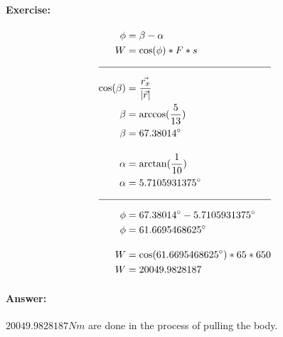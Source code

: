 \documentclass{article}
\begin{document}
\paragraph{Exercise:}

\begin{align} 
    \phi &= \beta - \alpha \\
    W &= \cos(\phi)*F*s \\[10pt]
    \hline 
    \noalign{\vskip 10pt}
    \cos(\beta) &= \frac{\vec{r_x}}{|\vec{r}|} \\
    \beta &= \arccos(\frac{5}{13}) \\
    \beta &= 67.38014^\circ \\[10pt]
    \alpha &= \arctan(\frac{1}{10}) \\
    \alpha &= 5.7105931375^\circ \\[10pt]
    \hline 
    \noalign{\vskip 10pt}
    \phi &= 67.38014^\circ - 5.7105931375^\circ \\
    \phi &= 61.6695468625^\circ \\[10pt]
    W &= \cos(61.6695468625^\circ) * 65 * 650 \\
    W &= 20049.9828187
\end{align}

\paragraph{Answer:}
$20049.9828187Nm$ are done in the process of pulling the body.
\end{document}
